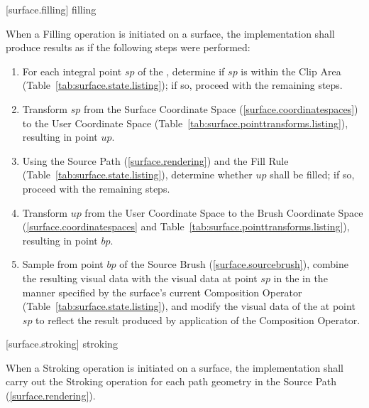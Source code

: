  [surface.filling] { filling}

\pnum
When a Filling operation is initiated on a surface, the implementation shall produce results as if the following steps were performed:

\begin{enumerate}
\item For each integral point $sp$ of the \underlyingsurface, determine if $sp$ is within the Clip Area (Table~\ref{tab:surface.state.listing}); if so, proceed with the remaining steps.
\item Transform $sp$ from the Surface Coordinate Space (\ref{surface.coordinatespaces}) to the User Coordinate Space (Table~\ref{tab:surface.pointtransforms.listing}), resulting in point $up$.
\item Using the Source Path (\ref{surface.rendering}) and the Fill Rule (Table~\ref{tab:surface.state.listing}), determine whether $up$ shall be filled; if so, proceed with the remaining steps.
\item Transform $up$ from the User Coordinate Space to the Brush Coordinate Space (\ref{surface.coordinatespaces} and Table~\ref{tab:surface.pointtransforms.listing}), resulting in point $bp$.
\item Sample from point $bp$ of the Source Brush (\ref{surface.sourcebrush}), combine the resulting visual data with the visual data at point $sp$ in the \underlyingsurface in the manner specified by the surface's current Composition Operator (Table~\ref{tab:surface.state.listing}), and modify the visual data of the \underlyingsurface at point $sp$ to reflect the result produced by application of the Composition Operator.
\end{enumerate}

 [surface.stroking] { stroking}

\pnum
When a Stroking operation is initiated on a surface, the implementation shall carry out the Stroking operation for each path geometry in the Source Path (\ref{surface.rendering}).

